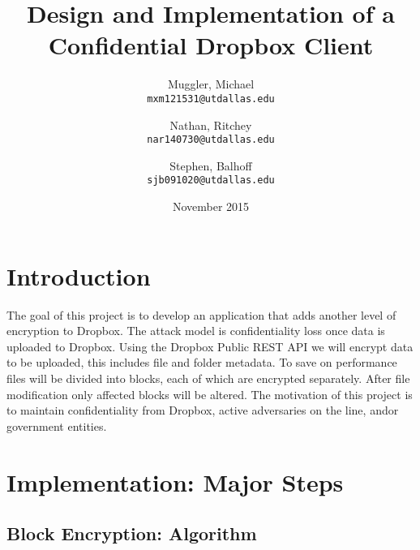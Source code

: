 \documentclass[11pt]{article}
\title{Design and Implementation of a Confidential Dropbox Client}
\author{
  Muggler, Michael\\
  \texttt{mxm121531@utdallas.edu}
  \and
  Nathan, Ritchey\\
  \texttt{nar140730@utdallas.edu} 
  \and
  Stephen, Balhoff\\
  \texttt{sjb091020@utdallas.edu}
}
\date{November 2015}
\begin{document}
\maketitle

\section{Introduction}

The goal of this project is to develop an application that adds another level of encryption to Dropbox. The attack model is confidentiality loss once data is uploaded to Dropbox. Using the Dropbox Public REST API we will encrypt data to be uploaded, this includes file and folder metadata. To save on performance files will be divided into blocks, each of which are encrypted separately. After file modification only affected blocks will be altered. The motivation of this project is to maintain confidentiality from Dropbox, active adversaries on the line, and\/or government entities.







\section{Implementation: Major Steps}
\subsection{Block Encryption: Algorithm}
\end{document}
